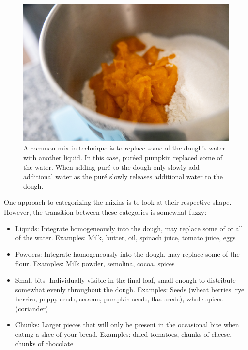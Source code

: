 \begin{figure}[htb!]
  \includegraphics[width=\textwidth]{pumpkin-on-flour}
  \caption[Pumpkin puré]{A common mix-in technique is to replace some of
    the dough's water with another liquid. In this case, puréed pumpkin replaced
    some of the water. When adding puré to the dough only slowly add
    additional water as the puré slowly releases additional water to the
    dough.}%
\end{figure}

One approach to categorizing the mixins is to look at their respective shape.
However, the transition between these categories is somewhat fuzzy:

\begin{itemize}
  \item Liquids: Integrate homogeneously into the dough, may replace some of
      or all of the water. Examples: Milk, butter, oil, spinach juice, tomato
      juice, eggs
  \item Powders: Integrate homogeneously into the dough, may replace some of
      the flour. Examples: Milk powder, semolina, cocoa, spices
  \item Small bits: Individually visible in the final loaf, small enough to
      distribute somewhat evenly throughout the dough. Examples: Seeds (wheat
      berries, rye berries, poppy seeds, sesame, pumpkin seeds,
      flax seeds), whole spices (coriander)
  \item Chunks: Larger pieces that will only be present in the occasional bite
      when eating a slice of your bread. Examples: dried tomatoes, chunks of
      cheese, chunks of chocolate
\end{itemize}

